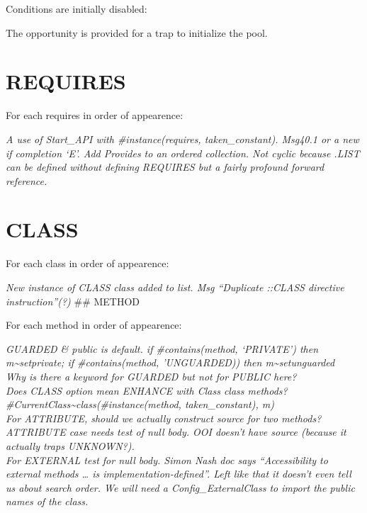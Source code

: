 

Conditions are initially disabled:



The opportunity is provided for a trap to initialize the pool.



\section{REQUIRES}\label{requires}

For each requires in order of appearence:

\emph{A use of Start\_API with \#instance(requires, taken\_constant).
Msg40.1 or a new if completion `E'. Add Provides to an ordered
collection. Not cyclic because .LIST can be defined without defining
REQUIRES but a fairly profound forward reference.}

\section{CLASS}\label{class}

For each class in order of appearence:



\emph{New instance of CLASS class added to list. Msg ``Duplicate ::CLASS
directive instruction''(?)} \#\# METHOD

For each method in order of appearence:



\emph{GUARDED \& public is default. if \#contains(method, `PRIVATE')
then m\textasciitilde setprivate; if \#contains(method, 'UNGUARDED))
then m\textasciitilde setunguarded\\
Why is there a keyword for GUARDED but not for PUBLIC here?\\
Does CLASS option mean ENHANCE with Class class methods?\\
\#CurrentClass\textasciitilde class(\#instance(method, taken\_constant),
m)\\
For ATTRIBUTE, should we actually construct source for two methods?
ATTRIBUTE case needs test of null body. OOI doesn't have source (because
it actually traps UNKNOWN?).\\
For EXTERNAL test for null body. Simon Nash doc says ``Accessibility to
external methods \ldots{} is implementation-defined''. Left like that it
doesn't even tell us about search order. We will need a
Config\_ExternalClass to import the public names of the class.}

